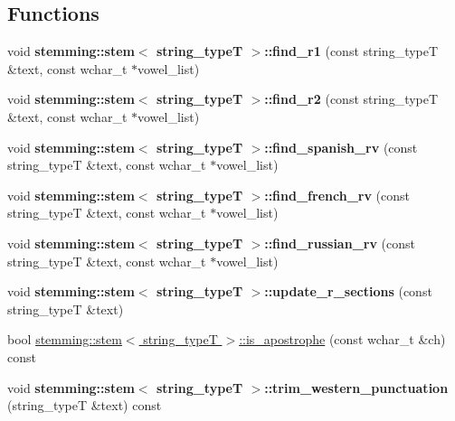 \subsection*{Functions}
\begin{DoxyCompactItemize}
\item 
\hypertarget{group___stemming_ga364b7a76f683d5244715638069a4fa93}{void {\bfseries stemming\-::stem$<$ string\-\_\-type\-T $>$\-::find\-\_\-r1} (const string\-\_\-type\-T \&text, const wchar\-\_\-t $\ast$vowel\-\_\-list)}\label{group___stemming_ga364b7a76f683d5244715638069a4fa93}

\item 
\hypertarget{group___stemming_gab381c0d6a6291c2c21515e9398e83085}{void {\bfseries stemming\-::stem$<$ string\-\_\-type\-T $>$\-::find\-\_\-r2} (const string\-\_\-type\-T \&text, const wchar\-\_\-t $\ast$vowel\-\_\-list)}\label{group___stemming_gab381c0d6a6291c2c21515e9398e83085}

\item 
\hypertarget{group___stemming_gae6cb258098ba91462d421977b1eed8e7}{void {\bfseries stemming\-::stem$<$ string\-\_\-type\-T $>$\-::find\-\_\-spanish\-\_\-rv} (const string\-\_\-type\-T \&text, const wchar\-\_\-t $\ast$vowel\-\_\-list)}\label{group___stemming_gae6cb258098ba91462d421977b1eed8e7}

\item 
\hypertarget{group___stemming_ga9626e49b982eda0d8ec3bb861d864b42}{void {\bfseries stemming\-::stem$<$ string\-\_\-type\-T $>$\-::find\-\_\-french\-\_\-rv} (const string\-\_\-type\-T \&text, const wchar\-\_\-t $\ast$vowel\-\_\-list)}\label{group___stemming_ga9626e49b982eda0d8ec3bb861d864b42}

\item 
\hypertarget{group___stemming_ga53dcfe6b18fe5b5882474f222190ef1b}{void {\bfseries stemming\-::stem$<$ string\-\_\-type\-T $>$\-::find\-\_\-russian\-\_\-rv} (const string\-\_\-type\-T \&text, const wchar\-\_\-t $\ast$vowel\-\_\-list)}\label{group___stemming_ga53dcfe6b18fe5b5882474f222190ef1b}

\item 
\hypertarget{group___stemming_ga9dcc3d89844ecd5c81eabf80936a0209}{void {\bfseries stemming\-::stem$<$ string\-\_\-type\-T $>$\-::update\-\_\-r\-\_\-sections} (const string\-\_\-type\-T \&text)}\label{group___stemming_ga9dcc3d89844ecd5c81eabf80936a0209}

\item 
bool \hyperlink{group___stemming_ga0b423c8a1a53ec586da4613472d61e34}{stemming\-::stem$<$ string\-\_\-type\-T $>$\-::is\-\_\-apostrophe} (const wchar\-\_\-t \&ch) const 
\item 
\hypertarget{group___stemming_ga36818a956dd34c388fa9942ed46e28b4}{void {\bfseries stemming\-::stem$<$ string\-\_\-type\-T $>$\-::trim\-\_\-western\-\_\-punctuation} (string\-\_\-type\-T \&text) const }\label{group___stemming_ga36818a956dd34c388fa9942ed46e28b4}


\end{DoxyCompactItemize}
